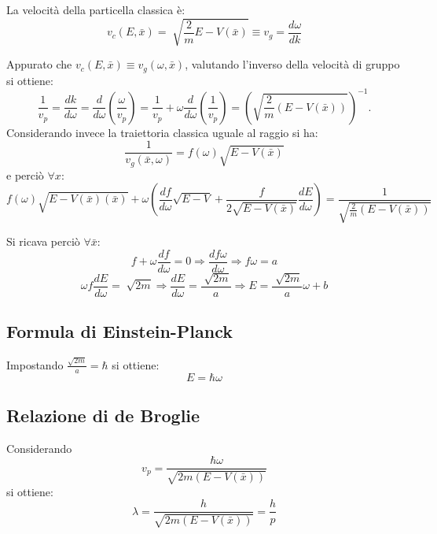 La velocità della particella classica è:
\begin{equation}
v_c\left(E, \bar x\right)=\sqrt[]{\frac{2}{m}E-V(\bar x)}\equiv v_g=\frac{d\omega}{dk}
\end{equation}

Appurato che $v_c\left(E, \bar x\right)\equiv v_g\left(\omega, \bar x\right)$, valutando l'inverso della velocità di gruppo si ottiene:
\begin{equation}
\label{eq:inversa_vel_gruppo}
\frac{1}{v_p}=\frac{dk}{d\omega}=\frac{d}{d\omega}\left(\frac{\omega}{v_p}\right)=\frac{1}{v_p}+\omega\frac{d}{d\omega}\left(\frac{1}{v_p}\right)=\left(\sqrt{\frac{2}{m}(E-V(\bar x))}\right)^{-1}.
\end{equation}
Considerando invece la traiettoria classica uguale al raggio si ha:
\begin{equation}
\label{eq:inversa_vel_fase_classica}
\frac{1}{v_g(\bar x,\omega)}=f(\omega)\sqrt{E-V(\bar x)}
\end{equation}
e perciò $\forall x$:
\begin{equation}
f\left(\omega \right)\sqrt{E-V\left(\bar x\right)\left(\bar x\right)}+\omega \left(\frac{df}{d\omega }\sqrt{E-V}+\frac{f}{2\sqrt{E-V\left(\bar x\right)}}\frac{dE}{d\omega }\right)=\frac{1}{\sqrt{\frac{2}{m}\left(E-V\left(\bar x\right)\right)}}
\end{equation}

Si ricava perciò $\forall \bar x$:
\begin{equation}
f+\omega \frac{df}{d\omega }=0 \Longrightarrow \frac{df\omega }{d\omega }\Longrightarrow f\omega =a
\end{equation}
\begin{equation}
\omega f\frac{dE}{d\omega }=\sqrt[]{2m}\Longrightarrow \frac{dE}{d\omega }=\frac{\sqrt[]{2m}}{a}\Longrightarrow E=\frac{\sqrt[]{2m}}{a}\omega +b
\end{equation}

\subsection{Formula di Einstein-Planck} %
Impostando $\frac{\sqrt{2m}}{a}=\hbar $ si ottiene:
\begin{equation}
E=\hbar \omega 
\end{equation}

\subsection{Relazione di de Broglie} %
Considerando
\begin{equation}
v_p=\frac{\hbar \omega }{\sqrt{2m(E-V\left(\bar x\right))}}
\end{equation}
si ottiene:
\begin{equation}
\lambda =\frac{h}{\sqrt{2m(E-V\left(\bar x\right))}}=\frac{h}{p}
\end{equation}

